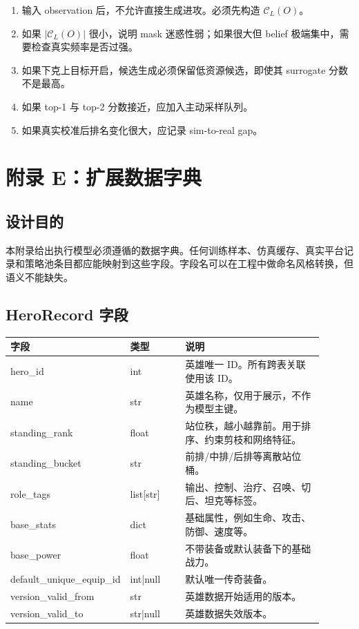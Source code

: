 \documentclass[UTF8,12pt,openany]{ctexbook}
\newcommand{\Ccal}{\mathcal{C}}
\begin{document}
\begin{enumerate}[leftmargin=2em]
\item 输入 observation 后，不允许直接生成进攻。必须先构造 $\Ccal_L(O)$。
\item 如果 $|\Ccal_L(O)|$ 很小，说明 mask 迷惑性弱；如果很大但 belief 极端集中，需要检查真实频率是否过强。
\item 如果下克上目标开启，候选生成必须保留低资源候选，即使其 surrogate 分数不是最高。
\item 如果 top-1 与 top-2 分数接近，应加入主动采样队列。
\item 如果真实校准后排名变化很大，应记录 sim-to-real gap。
\end{enumerate}



\chapter{附录 E：扩展数据字典}
\section{设计目的}
本附录给出执行模型必须遵循的数据字典。任何训练样本、仿真缓存、真实平台记录和策略池条目都应能映射到这些字段。字段名可以在工程中做命名风格转换，但语义不能缺失。

\section{HeroRecord 字段}
\begin{longtable}{p{0.25\linewidth}p{0.18\linewidth}p{0.47\linewidth}}
\toprule
字段 & 类型 & 说明 \\
\midrule
hero\_id & int & 英雄唯一 ID。所有跨表关联使用该 ID。\\
name & str & 英雄名称，仅用于展示，不作为模型主键。\\
standing\_rank & float & 站位秩，越小越靠前。用于排序、约束剪枝和网络特征。\\
standing\_bucket & str & 前排/中排/后排等离散站位桶。\\
role\_tags & list[str] & 输出、控制、治疗、召唤、切后、坦克等标签。\\
base\_stats & dict & 基础属性，例如生命、攻击、防御、速度等。\\
base\_power & float & 不带装备或默认装备下的基础战力。\\
default\_unique\_equip\_id & int|null & 默认唯一传奇装备。\\
version\_valid\_from & str & 英雄数据开始适用的版本。\\
version\_valid\_to & str|null & 英雄数据失效版本。\\
\bottomrule
\end{longtable}
\end{document}
